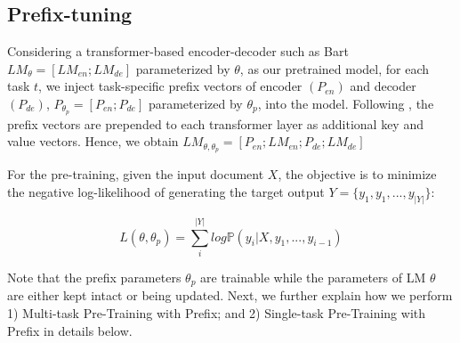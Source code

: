 \subsection{Prefix-tuning} \label{subsection-prefix-tuning}

Considering a transformer-based encoder-decoder such as Bart \cite{lewis2019bart} $LM_{\theta} = [LM_{en}; LM_{de}]$ parameterized by $\theta$, as our pretrained model, for each task $t$, we inject task-specific prefix vectors of encoder $(P_{en})$ and decoder $(P_{de})$, $P_{\theta_{p}} = [P_{en}; P_{de}]$ parameterized by $\theta_{p}$, into the model. Following \citet{li2021prefix}, the prefix vectors are prepended to each transformer layer as additional key and value vectors. Hence, we obtain $LM_{\theta, \theta_{p}} = [P_{en}; LM_{en}; P_{de}; LM_{de}]$

For the pre-training, given the input document $X$, the objective is to minimize the negative log-likelihood of generating the target output $Y = \{y_{1}, y_{1}, ..., y_{|Y|} \}$:

\begin{equation}
L(\theta , \theta_{p}) = \sum_{i}^{|Y|} log \mathbb{P}(y_{i} | X, y_{1}, ..., y_{i-1}) 
\end{equation}

Note that the prefix parameters $\theta_{p}$ are trainable while the parameters of LM $\theta$ are either kept intact or being updated. Next, we further explain how we perform 1) Multi-task Pre-Training with Prefix; and 2) Single-task Pre-Training with Prefix in details below.





